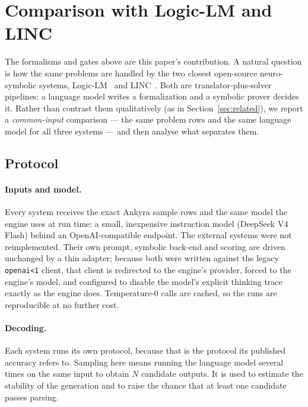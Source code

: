 \documentclass[11pt,a4paper]{article}
\begin{document}
\section{Comparison with Logic-LM and LINC}
\label{sec:comparison}

The formalisms and gates above are this paper's contribution. A natural question is how the
same problems are handled by the two closest open-source neuro-symbolic systems,
Logic-LM~\cite{logiclm} and LINC~\cite{linc}. Both are translator-plus-solver pipelines: a
language model writes a formalization and a symbolic prover decides it. Rather than contrast
them qualitatively (as in Section~\ref{sec:related}), we report a \emph{common-input}
comparison --- the same problem rows and the same language model for all three systems ---
and then analyse what separates them.

\subsection{Protocol}
\label{sec:comparison-protocol}

\paragraph{Inputs and model.} Every system receives the exact Ankyra sample rows and the
same model the engine uses at run time: a small, inexpensive instruction model (DeepSeek V4
Flash) behind an OpenAI-compatible endpoint. The external systems were not reimplemented.
Their own prompt, symbolic back-end and scoring are driven unchanged by a thin adapter;
because both were written against the legacy \texttt{openai<1} client, that client is
redirected to the engine's provider, forced to the engine's model, and configured to
disable the model's explicit thinking trace exactly as the engine does. Temperature-0 calls
are cached, so the runs are reproducible at no further cost.

\paragraph{Decoding.} Each system runs its own protocol, because that is the protocol its
published accuracy refers to. Sampling here means running the language model several times
on the same input to obtain $N$ candidate outputs. It is used to estimate the stability of
the generation and to raise the chance that at least one candidate passes parsing.
\end{document}
